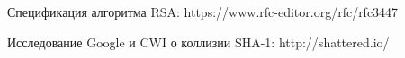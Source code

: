 
\begin{thebibliography}{2}
Спецификация алгоритма RSA: https://www.rfc-editor.org/rfc/rfc3447

Исследование Google и CWI о коллизии SHA-1: http://shattered.io/
\end{thebibliography}
